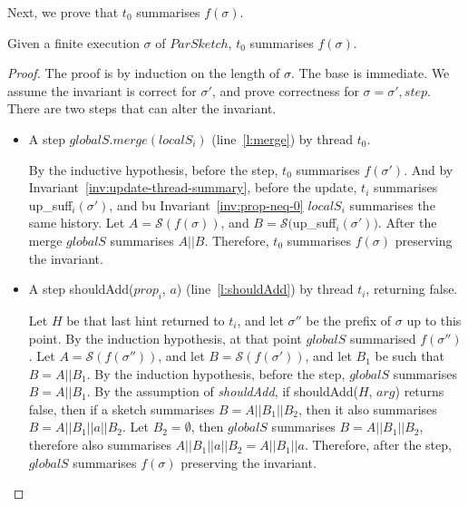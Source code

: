 Next, we prove that $t_0$ summarises $f(\sigma)$.
\begin{invariant}
    Given a finite execution $\sigma$ of $ParSketch$, $t_0$ summarises $f(\sigma)$.
    \label{inv:G-partial-summary}
\end{invariant}
\begin{proof}
    The proof is by induction on the length of $\sigma$. The base is immediate.
    We assume the invariant is correct for $\sigma'$, and prove correctness for $\sigma=\sigma',step$.
    There are two steps that can alter the invariant.
    \begin{itemize}
        \item A step $globalS.merge(localS_i)$ (line~\ref{l:merge}) by thread $t_0$.
        
        By the inductive hypothesis, before the step, $t_0$ summarises $f(\sigma')$. And by
        Invariant~\ref{inv:update-thread-summary}, before the update, $t_i$ summarises
        up\_suff$_i(\sigma')$, and bu Invariant~\ref{inv:prop-neq-0} $localS_i$ summarises the same history.
        Let $A={\mathcal{S}}(f(\sigma))$, and $B={\mathcal{S}}($up\_suff$_i(\sigma')$$)$.
        After the merge $globalS$ summarises $A||B$. Therefore,
        $t_0$ summarises $f(\sigma)$ preserving the invariant.

        \item A step shouldAdd($prop_i$, $a$) (line~\ref{l:shouldAdd}) by thread $t_i$, returning false.     
        
        Let $H$ be that last hint returned to $t_i$, and let $\sigma''$ be the prefix of $\sigma$ up to this point.
        By the induction hypothesis, at that point $globalS$ summarised $f(\sigma'')$.
        Let $A=\mathcal{S}$$(f(\sigma''))$, and let $B=\mathcal{S}$$(f(\sigma'))$,
        and let $B_1$ be such that $B=A||B_1$. By the induction hypothesis,
        before the step, $globalS$ summarises $B=A||B_1$.
        By the assumption of \emph{shouldAdd}, if shouldAdd($H$, $arg$) returns false, then if
        a sketch summarises $B=A||B_1||B_2$, then it also summarises $B=A||B_1||a||B_2$. Let
        $B_2=\emptyset$, then $globalS$ summarises $B=A||B_1||B_2$, therefore also summarises 
        $A||B_1||a||B_2=A||B_1||a$. Therefore, after the step, $globalS$ summarises $f(\sigma)$
        preserving the invariant.
    \end{itemize}
\end{proof}

